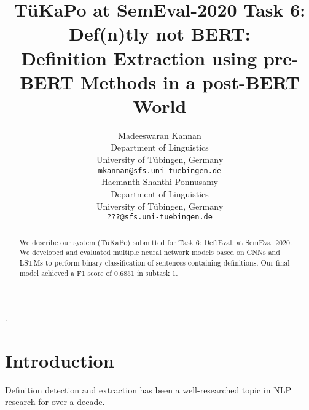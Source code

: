 \documentclass[11pt]{article}
\title{T\"uKaPo at SemEval-2020 Task 6: Def(n)tly not BERT:\\
Definition Extraction using pre-BERT Methods in a post-BERT World}
\author{Madeeswaran Kannan \\
  Department of Linguistics \\
  University of T\"ubingen, Germany \\
  {\tt mkannan@sfs.uni-tuebingen.de} \\\And
  Haemanth Shanthi Ponnusamy \\
  Department of Linguistics \\
  University of T\"ubingen, Germany \\
  {\tt ???@sfs.uni-tuebingen.de} \\}
\date{}
\begin{document}
\setlength{\parindent}{0pt}.

\maketitle
\begin{abstract}
  We describe our system (T\"{u}KaPo) submitted for Task 6: DeftEval, at SemEval 2020.
  We developed and evaluated multiple neural network models based on CNNs and LSTMs to
  perform binary classification of sentences containing definitions. Our final model
  achieved a F1 score of 0.6851 in subtask 1.
\end{abstract}

\renewcommand*{\arraystretch}{1.25}

\section{Introduction}

Definition detection and extraction has been a well-researched topic in NLP research
for over a decade.
%
%
\end{document}
